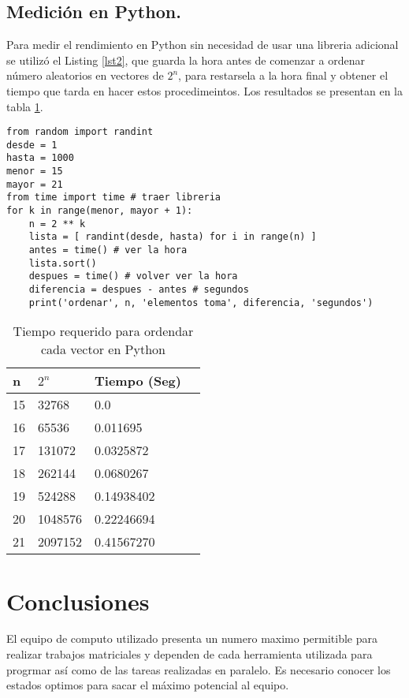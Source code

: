 \documentclass{article}
\begin{document}
\subsection{Medición en Python.} 
Para medir el rendimiento en Python sin necesidad de usar una libreria adicional se utilizó el Listing \ref{lst2}, que guarda la hora antes de comenzar a ordenar número aleatorios en vectores de $2^n$, para restarsela a la hora final y obtener el tiempo que tarda en hacer estos procedimeintos. Los resultados se presentan en la tabla \ref{tabla 2}.
\lstset{language=Python}
\lstset{frame=lines}
\lstset{basicstyle=\footnotesize}
\begin{lstlisting}
from random import randint
desde = 1
hasta = 1000
menor = 15
mayor = 21
from time import time # traer libreria
for k in range(menor, mayor + 1):
    n = 2 ** k
    lista = [ randint(desde, hasta) for i in range(n) ]
    antes = time() # ver la hora
    lista.sort()
    despues = time() # volver ver la hora
    diferencia = despues - antes # segundos
    print('ordenar', n, 'elementos toma', diferencia, 'segundos')
\end{lstlisting}
\begin{table}[h]
\centering
\begin{tabular}{|l|l|l|l|}
\hline
n  & $2^n$& Tiempo (Seg) \\ \hline
15  & 32768                    & 0.0                            \\ \hline
16  & 65536                    & 0.011695                            \\ \hline
17  & 131072                   & 0.0325872                          \\ \hline
18  & 262144                   & 0.0680267                              \\ \hline
19  & 524288                   & 0.14938402                              \\ \hline
20  & 1048576                  & 0.22246694                             \\ \hline
21  & 2097152                  & 0.41567270                             \\ \hline
\end{tabular}
\caption{Tiempo requerido para ordendar cada vector en Python}
\label{tabla 2}
\end{table}

\section{Conclusiones}
El equipo de computo utilizado presenta un numero maximo permitible para realizar trabajos matriciales y dependen de cada herramienta utilizada para progrmar así como de las tareas realizadas en paralelo. Es necesario conocer los estados optimos para sacar el máximo potencial al equipo.
\end{document}
